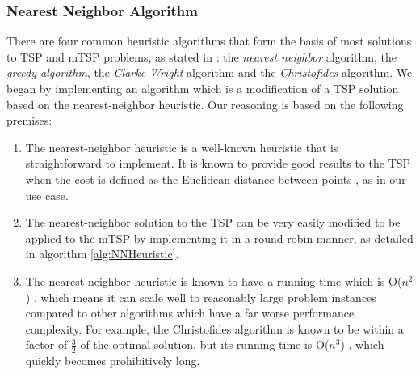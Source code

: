 \subsubsection{Nearest Neighbor Algorithm}
There are four common heuristic algorithms that form the basis of most solutions to TSP and mTSP problems, as stated in \cite{Johnson1997TheOptimization}: the \textit{nearest neighbor} algorithm, the \textit{greedy algorithm}, the \textit{Clarke-Wright} algorithm and the \textit{Christofides} algorithm. We began by implementing an algorithm which is a modification of a TSP solution based on the nearest-neighbor heuristic. Our reasoning is based on the following premises:
\begin{enumerate}
    \item The nearest-neighbor heuristic is a well-known heuristic that is straightforward to implement. It is known to provide good results to the TSP when the cost is defined as the Euclidean distance between points \cite{Johnson1995TheOptimization}, as in our use case.
    \item The nearest-neighbor solution to the TSP can be very easily modified to be applied to the mTSP by implementing it in a round-robin manner, as detailed in algorithm \ref{alg:NNHeuristic}.
    \item The nearest-neighbor heuristic is known to have a running time which is O($n^2$) \cite{Rosenkrantz1977AnProblem}, which means it can scale well to reasonably large problem instances compared to other algorithms which have a far worse performance complexity. For example, the Christofides algorithm is known to be within a factor of $\frac{3}{2}$ of the optimal solution, but its running time is O($n^3$) \cite{Christofides1976WORST-CASEPROBLEM}, which quickly becomes prohibitively long.
\end{enumerate}

